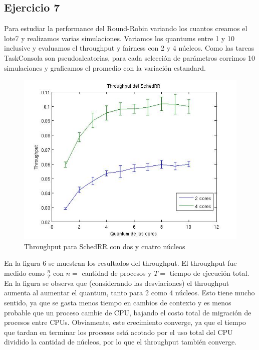   \subsection{Ejercicio 7}

  Para estudiar la performance del Round-Robin variando los cuantos creamos el lote7 y realizamos varias simulaciones. Variamos los quantums entre 1 y 10 inclusive y evaluamos el throughput y fairness con 2 y 4 n\'ucleos. Como las tareas TaskConsola son pseudoaleatorias,
  para cada selecci\'on de par\'ametros corrimos 10 simulaciones y graficamos el promedio con la variaci\'on estandard.

  \begin{figure}
  \includegraphics[scale=0.6]{images/TH.jpg}
  \caption{Throughput para SchedRR con dos y cuatro n\'ucleos}
  \end{figure}

  En la figura 6 se muestran los resultados del throughput. El throughput fue medido como $\frac{n}{T}$ con $n = $ cantidad de procesos y $T = $ tiempo de ejecuci\'on total. En la figura se observa que (considerando las desviaciones) el throughput aumenta al aumentar el quantum, tanto para 2 como 4 n\'ucleos. Esto tiene mucho sentido, ya que se
  gasta menos tiempo en cambios de contexto y es menos probable que un proceso cambie de CPU, bajando el costo total de migraci\'on de procesos entre CPUs. Obviamente, este crecimiento converge, ya que el tiempo que tardan en terminar los procesos est\'a acotado por
  el uso total del CPU dividido la cantidad de n\'ucleos, por lo que el throughput tambi\'en converge.

